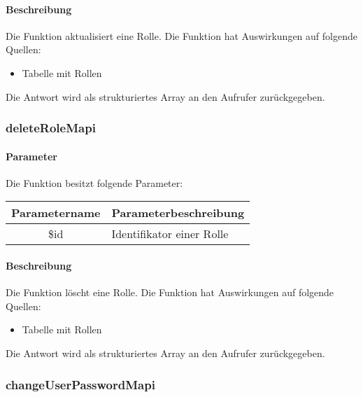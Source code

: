 \paragraph{Beschreibung} Die Funktion aktualisiert eine Rolle. Die Funktion hat Auswirkungen auf folgende Quellen:
\begin{itemize}
	\item Tabelle mit Rollen
\end{itemize}
Die Antwort wird als strukturiertes Array an den Aufrufer zurückgegeben.
\subsubsection{deleteRoleMapi}
\paragraph{Parameter} Die Funktion besitzt folgende Parameter:
\begin{table}[H]
	\begin{tabular}{|c|p{11cm}|}
		\hline
		\textbf{Parametername} & \textbf{Parameterbeschreibung} \\ \hline
		\$id & Identifikator einer Rolle \\ \hline
	\end{tabular}
\end{table}
\paragraph{Beschreibung} Die Funktion löscht eine Rolle. Die Funktion hat Auswirkungen auf folgende Quellen:
\begin{itemize}
	\item Tabelle mit Rollen
\end{itemize}
Die Antwort wird als strukturiertes Array an den Aufrufer zurückgegeben.
\subsubsection{changeUserPasswordMapi}
